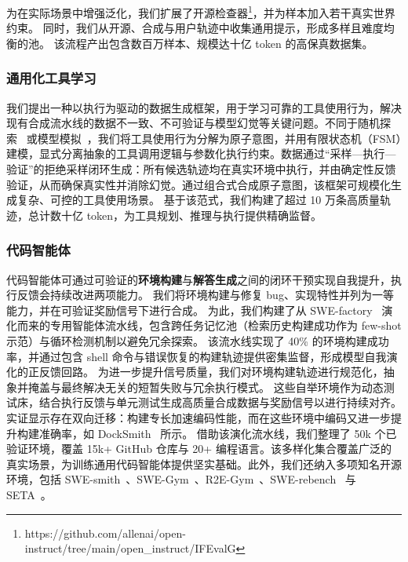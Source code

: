 为在实际场景中增强泛化，我们扩展了开源检查器\footnote{https://github.com/allenai/open-instruct/tree/main/open\_instruct/IFEvalG}，并为样本加入若干真实世界约束。
同时，我们从开源、合成与用户轨迹中收集通用提示，形成多样且难度均衡的池。
该流程产出包含数百万样本、规模达十亿 token 的高保真数据集。


\subsubsection{通用化工具学习}
我们提出一种以执行为驱动的数据生成框架，用于学习可靠的工具使用行为，解决现有合成流水线的数据不一致、不可验证与模型幻觉等关键问题。不同于随机探索~\cite{liu2025webexplorer,li2025websailor} 或模型模拟~\cite{kimi_k2,li2025simulating}，我们将工具使用行为分解为原子意图，并用有限状态机（FSM）建模，显式分离抽象的工具调用逻辑与参数化执行约束。数据通过“采样—执行—验证”的拒绝采样闭环生成：所有候选轨迹均在真实环境中执行，并由确定性反馈验证，从而确保真实性并消除幻觉。通过组合式合成原子意图，该框架可规模化生成复杂、可控的工具使用场景。
基于该范式，我们构建了超过 10 万条高质量轨迹，总计数十亿 token，为工具规划、推理与执行提供精确监督。

\subsubsection{代码智能体}
代码智能体可通过可验证的\textbf{环境构建}与\textbf{解答生成}之间的闭环干预实现自我提升，执行反馈会持续改进两项能力。
我们将环境构建与修复 bug、实现特性并列为一等能力，并在可验证奖励信号下进行合成。
为此，我们构建了从 SWE-factory~\cite{guo2026swefactoryautomatedfactoryissue} 演化而来的专用智能体流水线，包含跨任务记忆池（检索历史构建成功作为 few-shot 示范）与循环检测机制以避免冗余探索。
该流水线实现了 40\% 的环境构建成功率，并通过包含 shell 命令与错误恢复的构建轨迹提供密集监督，形成模型自我演化的正反馈回路。
为进一步提升信号质量，我们对环境构建轨迹进行规范化，抽象并掩盖与最终解决无关的短暂失败与冗余执行模式。
这些自举环境作为动态测试床，结合执行反馈与单元测试生成高质量合成数据与奖励信号以进行持续对齐。实证显示存在双向迁移：构建专长加速编码性能，而在这些环境中编码又进一步提升构建准确率，如 DockSmith~\cite{zhang2026docksmithscalingreliablecoding} 所示。
借助该演化流水线，我们整理了 50k 个已验证环境，覆盖 15k+ GitHub 仓库与 20+ 编程语言。该多样化集合覆盖广泛的真实场景，为训练通用代码智能体提供坚实基础。此外，我们还纳入多项知名开源环境，包括 SWE-smith~\cite{yang2025swe}、SWE-Gym~\cite{pan2024training}、R2E-Gym~\cite{jain2025r2e}、SWE-rebench~\cite{badertdinov2025swe} 与 SETA~\cite{seta}。


